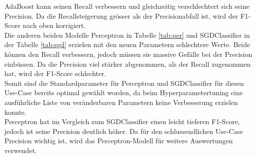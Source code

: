AdaBoost kann seinen Recall verbessern und gleichzeitig verschlechtert sich seine Precision.
Da die Recallsteigerung grösser als der Precisionabfall ist, wird der F1-Score nach oben korrigiert.\\
Die anderen beiden Modelle Perceptron in Tabelle \cref{tab:per} und SGDClassifier in der Tabelle \cref{tab:sgd} erzielen mit den neuen Parametern schlechtere Werte.
Beide können den Recall verbessern, jedoch müssen sie massive Gefälle bei der Precision einbüssen.
Da die Precision viel stärker abgenommen, als der Recall zugenommen hat, wird der F1-Score schlechter.\\
Somit sind die Standardparameter für Perceptron und SGDClassifier für diesen \glqq Use-Case\grqq{} bereits optimal gewählt worden, da beim Hyperparametertuning eine ausführliche Liste von veränderbaren Parametern keine Verbesserung erzielen konnte.\\
Perceptron hat im Vergleich zum SGDClassifier einen leicht tieferen F1-Score, jedoch ist seine Precision deutlich höher.
Da für den schlussendlichen \glqq Use-Case\grqq{} Precision wichtig ist, wird das Perceptron-Modell für weitere Auswertungen verwendet.
